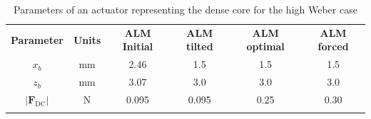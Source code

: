 \clearpage

\begin{table}[!h]
\centering
\caption{Parameters of an actuator representing the dense core for the high Weber case}
\begin{tabular}{cccccc}
\thickhline
\textbf{Parameter} & \textbf{Units} &  \textbf{ALM Initial} & \textbf{ALM tilted} &  \textbf{ALM optimal} & \textbf{ALM forced} \\
\thickhline
$x_b$ & mm & 2.46 & 1.5 & 1.5 & 1.5 \\
$z_b$ & mm & 3.07 & 3.0 & 3.0 & 3.0 \\
$| \textbf{F}_\mathrm{DC} |$ & N & 0.095 & 0.095 & 0.25 & 0.30 \\
\thickhline
\end{tabular}
\label{tab:jicf_lgs_ALM_parameters}
\end{table}







